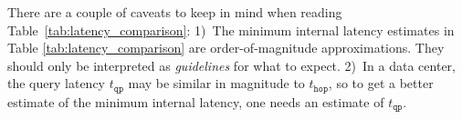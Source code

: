 \begin{savenotes}
\begin{table}[ht!]
  \caption{Latency based on geographic distribution of the cluster}
  \footnotesize
  \label{tab:latency_comparison}
\end{table}
\end{savenotes}

There are a couple of caveats to keep in mind when reading Table~\ref{tab:latency_comparison}: 1)~The minimum internal latency estimates in Table \ref{tab:latency_comparison} are order-of-magnitude approximations. They should only be interpreted as \emph{guidelines} for what to expect. 2)~In a data center, the query latency $t_{\mathtt{qp}}$ may be similar in magnitude to $t_\mathtt{hop}$, so to get a better estimate of the minimum internal latency, one needs an estimate of $t_{\mathtt{qp}}$.
